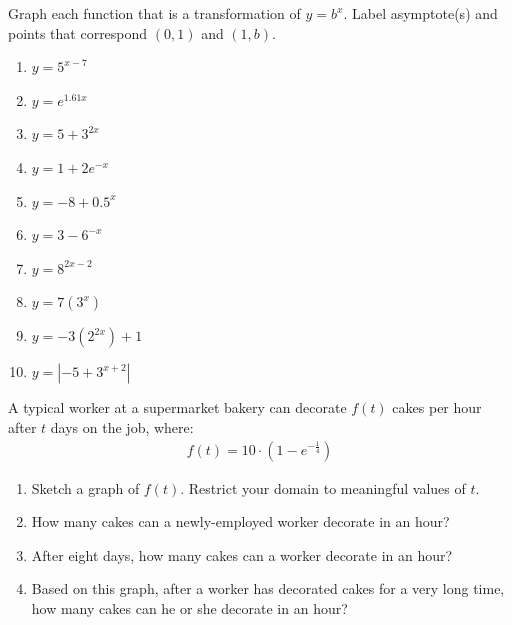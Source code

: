 \documentclass[10pt,]{book}
\theoremstyle{ptxdefinitionnotitle}
\theoremstyle{ptxdefinitiontitle}
\theoremstyle{ptxdefinitionnotitle}
\theoremstyle{ptxdefinitiontitle}
\theoremstyle{ptxdefinitionnotitle}
\theoremstyle{ptxdefinitiontitle}
\numberwithin{equation}{section}
\begin{document}
\begin{divisionexercise}{3}\hypertarget{exercise-64}{}
\hypertarget{p-260}{}%
Graph each function that is a transformation of \(y=b^x\). Label asymptote(s) and points that correspond \((0, 1)\) and \((1, b)\).%
\leavevmode%
\begin{enumerate}[label=(\alph*)]
\item\hypertarget{li-128}{}\(y=5^{x-7}\)%
\item\hypertarget{li-129}{}\(y=e^{1.61x}\)%
\item\hypertarget{li-130}{}\(y=5+3^{2x}\)%
\item\hypertarget{li-131}{}\(y=1+2e^{-x}\)%
\item\hypertarget{li-132}{}\(y=-8+0.5^x\)%
\item\hypertarget{li-133}{}\(y=3-6^{-x}\)%
\item\hypertarget{li-134}{}\(y=8^{2x-2}\)%
\item\hypertarget{li-135}{}\(y=7(3^x)\)%
\item\hypertarget{li-136}{}\(y=-3(2^{2x})+1\)%
\item\hypertarget{li-137}{}\(y=|-5+3^{x+2}|\)%
\end{enumerate}
\end{divisionexercise}%
\begin{divisionexercise}{4}\hypertarget{exercise-65}{}
\hypertarget{p-261}{}%
A typical worker at a supermarket bakery can decorate \(f(t)\) cakes per hour after \(t\) days on the job, where:%
%
\begin{gather*}
f(t)=10 \cdot ( 1-e^{-\frac{1}{4}} )
\end{gather*}
\leavevmode%
\begin{enumerate}[label=(\alph*)]
\item\hypertarget{li-138}{}Sketch a graph of \(f(t)\). Restrict your domain to meaningful values of \(t\).%
\item\hypertarget{li-139}{}How many cakes can a newly-employed worker decorate in an hour?%
\item\hypertarget{li-140}{}After eight days, how many cakes can a worker decorate in an hour?%
\item\hypertarget{li-141}{}Based on this graph, after a worker has decorated cakes for a very long time, how many cakes can he or she decorate in an hour?%
\end{enumerate}
\end{divisionexercise}%
\end{document}
